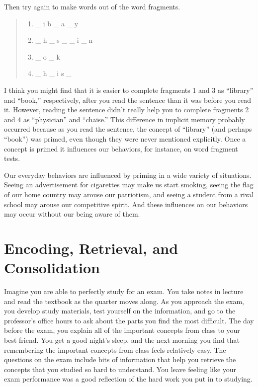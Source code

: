 \documentclass[
]{krantz}
\providecommand{\tightlist}{%
  \setlength{\itemsep}{0pt}\setlength{\parskip}{0pt}}
\begin{document}
Then try again to make words out of the word fragments.

\begin{quote}
\begin{enumerate}
\def\labelenumi{\arabic{enumi}.}
\tightlist
\item
  \_ i b \_ a \_ y
\item
  \_ h \_ s \_ \_ i \_ n
\item
  \_ o \_ k
\item
  \_ h \_ i s \_
\end{enumerate}
\end{quote}

I think you might find that it is easier to complete fragments 1 and 3 as ``library'' and ``book,'' respectively, after you read the sentence than it was before you read it. However, reading the sentence didn't really help you to complete fragments 2 and 4 as ``physician'' and ``chaise.'' This difference in implicit memory probably occurred because as you read the sentence, the concept of ``library'' (and perhaps ``book'') was primed, even though they were never mentioned explicitly. Once a concept is primed it influences our behaviors, for instance, on word fragment tests.

Our everyday behaviors are influenced by priming in a wide variety of situations. Seeing an advertisement for cigarettes may make us start smoking, seeing the flag of our home country may arouse our patriotism, and seeing a student from a rival school may arouse our competitive spirit. And these influences on our behaviors may occur without our being aware of them.

\hypertarget{encoding-retrieval-and-consolidation}{%
\section{Encoding, Retrieval, and Consolidation}\label{encoding-retrieval-and-consolidation}}

Imagine you are able to perfectly study for an exam. You take notes in lecture and read the textbook as the quarter moves along. As you approach the exam, you develop study materials, test yourself on the information, and go to the professor's office hours to ask about the parts you find the most difficult. The day before the exam, you explain all of the important concepts from class to your best friend. You get a good night's sleep, and the next morning you find that remembering the important concepts from class feels relatively easy. The questions on the exam include bits of information that help you retrieve the concepts that you studied so hard to understand. You leave feeling like your exam performance was a good reflection of the hard work you put in to studying.
\end{document}
